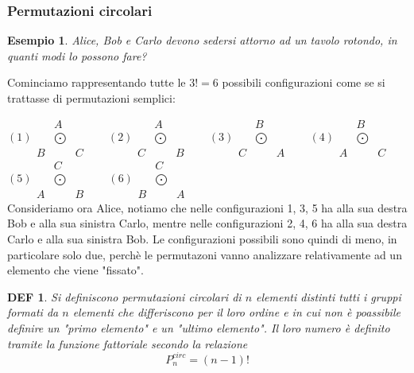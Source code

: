 \documentclass{article}     %
\newtheorem*{definition}{DEF}
\newtheorem{ex}{Esempio}[section]
\begin{document}
            \subsubsection{Permutazioni circolari} 
            \begin{ex}
                Alice, Bob e Carlo devono sedersi attorno ad un tavolo rotondo, in quanti modi lo possono fare?
                
            \end{ex}
            Cominciamo rappresentando tutte le $3!=6$ possibili configurazioni come se si trattasse di permutazioni semplici:

            $(1) \begin{array}{ccc}
                &A\\
                &\bigodot \\
                B&&C
            \end{array}$~~~
            $(2)\begin{array}{ccc}
                &A\\
                &\bigodot \\
                C&&B
            \end{array}$~~~
            $(3)\begin{array}{ccc}
                &B\\
                &\bigodot \\
                C&&A
            \end{array}$~~~
            $(4)\begin{array}{ccc}
                &B\\
                &\bigodot \\
                A&&C
            \end{array}$~~~
            $(5)\begin{array}{ccc}
                &C\\
                &\bigodot \\
                A&&B
            \end{array}$~~~
            $(6)\begin{array}{ccc}
                &C\\
                &\bigodot \\
                B&&A
            \end{array}$\\
            Consideriamo ora Alice, notiamo che nelle configurazioni 1, 3, 5 ha alla sua destra Bob e alla sua sinistra Carlo, mentre nelle configurazioni 2, 4, 6 ha alla sua destra Carlo e alla sua sinistra Bob. Le configurazioni possibili sono quindi di meno, in particolare solo due, perchè le permutazoni vanno analizzare relativamente ad un elemento che viene "fissato". 
            \begin{definition}
                Si definiscono permutazioni circolari di $n$ elementi distinti tutti i gruppi formati da $n$ elementi che differiscono per il loro ordine e in cui non è poassibile definire un "primo elemento" e un "ultimo elemento". Il loro numero è definito tramite la funzione fattoriale secondo la relazione \[P_n^{circ}=(n-1)!\]
            \end{definition}
            
\end{document}
